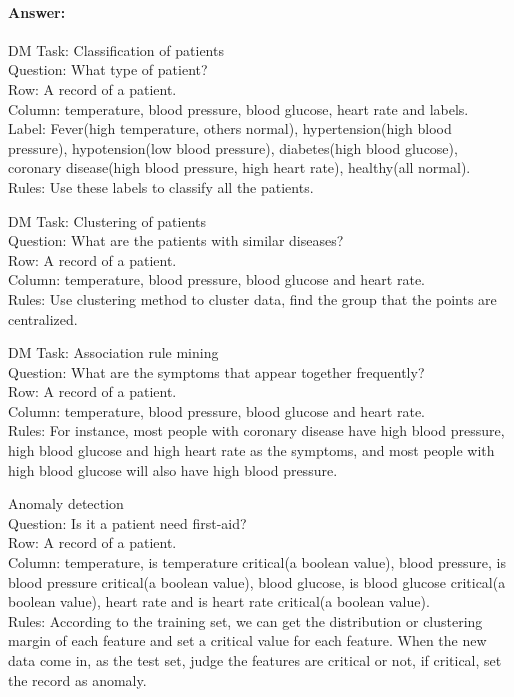 \documentclass{article}
\begin{document}
{    \paragraph{Answer: }{
        \begin{itemize}{
            \item DM Task: Classification of patients\\
            Question: What type of patient?\\
            Row: A record of a patient.\\
            Column: temperature, blood pressure, blood glucose, heart rate and labels.\\
            Label: Fever(high temperature, others normal), hypertension(high blood pressure), hypotension(low blood pressure), diabetes(high blood glucose), coronary disease(high blood pressure, high heart rate), healthy(all normal).\\
            Rules: Use these labels to classify all the patients.
            \item DM Task: Clustering of patients\\
            Question: What are the patients with similar diseases?\\
            Row: A record of a patient.\\
            Column: temperature, blood pressure, blood glucose and heart rate.\\
            Rules: Use clustering method to cluster data, find the group that the points are centralized.
            \item DM Task: Association rule mining\\
            Question: What are the symptoms that appear together frequently?\\
            Row: A record of a patient.\\
            Column: temperature, blood pressure, blood glucose and heart rate.\\
            Rules: For instance, most people with coronary disease have high blood pressure, high blood glucose and high heart rate as the symptoms, and most people with high blood glucose will also have high blood pressure.
            \item Anomaly detection\\
            Question: Is it a patient need first-aid?\\
            Row: A record of a patient.\\
            Column: temperature, is temperature critical(a boolean value), blood pressure, is blood pressure critical(a boolean value), blood glucose, is blood glucose critical(a boolean value), heart rate and is heart rate critical(a boolean value).\\
            Rules: According to the training set, we can get the distribution or clustering margin of each feature and set a critical value for each feature. When the new data come in, as the test set, judge the features are critical or not, if critical, set the record as anomaly.
        }
        \end{itemize}
    }
}
\end{document}
